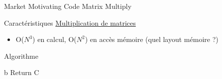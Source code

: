 %
\begin{Frame}{Market Motivating Code Matrix Multiply}

      \begin{block}{Caractéristiques
          \href{https://en.wikipedia.org/wiki/Matrix_multiplication_algorithm}{Multiplication
            de matrices}}
        \begin{itemize}
        \item O($N^3$) en calcul, O($N^2$) en accès mémoire (quel
          layout mémoire ?)
        \end{itemize}
      \end{block} 

      \begin{block}{Algorithme}
\begin{algorithm}[H]
b
Return C
\end{algorithm}
      \end{block}   

\end{Frame}


